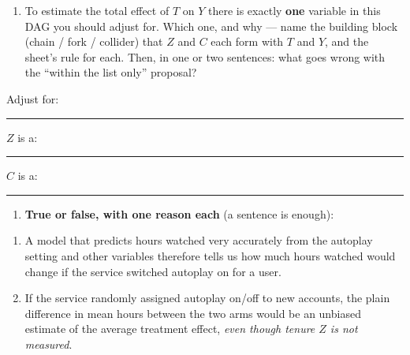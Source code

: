 \documentclass[
  11pt,
]{article}
\providecommand{\tightlist}{%
  \setlength{\itemsep}{0pt}\setlength{\parskip}{0pt}}
\newcommand{\answerspace}[1]{\par\vspace*{#1}}  %
\newcommand{\blank}[1][1.2in]{\rule{#1}{0.4pt}}
\begin{document}
\begin{center}
\end{center}

\begin{enumerate}
\def\labelenumi{(\alph{enumi})}
\tightlist
\item
  To estimate the total effect of \(T\) on \(Y\) there is exactly
  \textbf{one} variable in this DAG you should adjust for. Which one,
  and why --- name the building block (chain / fork / collider) that
  \(Z\) and \(C\) each form with \(T\) and \(Y\), and the sheet's rule
  for each. Then, in one or two sentences: what goes wrong with the
  ``within the list only'' proposal?
\end{enumerate}

Adjust for: \blank[0.6in]\qquad \(Z\) is a: \blank[1in]\qquad \(C\) is
a: \blank[1in]

\mbox{}

\par\nobreak\answerspace{1.1in}

\begin{enumerate}
\def\labelenumi{(\alph{enumi})}
\setcounter{enumi}{1}
\tightlist
\item
  \textbf{True or false, with one reason each} (a sentence is enough):
\end{enumerate}

\begin{enumerate}[label=(\roman*),leftmargin=3.2em,topsep=2pt]
\item A model that predicts hours watched very accurately from the autoplay
  setting and other variables therefore tells us how much hours watched would
  change if the service switched autoplay on for a user.
\item If the service randomly assigned autoplay on/off to new accounts, the
  plain difference in mean hours between the two arms would be an unbiased
  estimate of the average treatment effect, \emph{even though tenure $Z$ is not
  measured}.
\end{enumerate}
\end{document}
